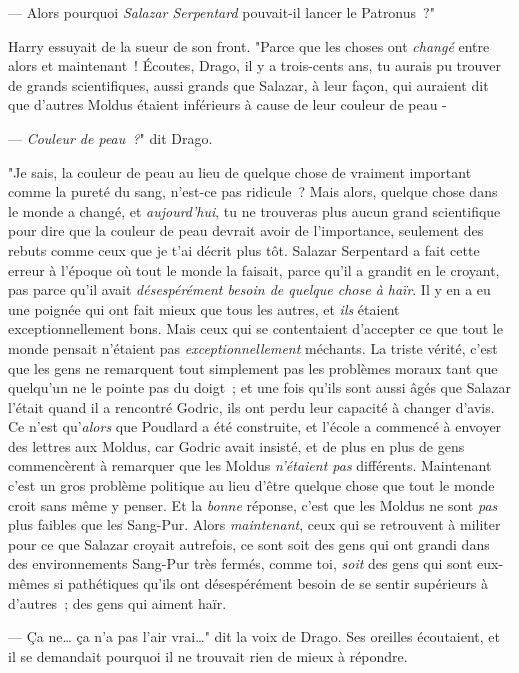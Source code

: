 --- Alors pourquoi \emph{Salazar Serpentard} pouvait-il lancer le Patronus~?"

Harry essuyait de la sueur de son front. "Parce que les choses ont \emph{changé} entre alors et maintenant~! Écoutes, Drago, il y a trois-cents ans, tu aurais pu trouver de grands scientifiques, aussi grands que Salazar, à leur façon, qui auraient dit que d'autres Moldus étaient inférieurs à cause de leur couleur de peau -

--- \emph{Couleur de peau~?}" dit Drago.

"Je sais, la couleur de peau au lieu de quelque chose de vraiment important comme la pureté du sang, n'est-ce pas ridicule~? Mais alors, quelque chose dans le monde a changé, et \emph{aujourd'hui}, tu ne trouveras plus aucun grand scientifique pour dire que la couleur de peau devrait avoir de l'importance, seulement des rebuts comme ceux que je t'ai décrit plus tôt. Salazar Serpentard a fait cette erreur à l'époque où tout le monde la faisait, parce qu'il a grandit en le croyant, pas parce qu'il avait \emph{désespérément besoin de quelque chose à haïr}. Il y en a eu une poignée qui ont fait mieux que tous les autres, et \emph{ils} étaient exceptionnellement bons. Mais ceux qui se contentaient d'accepter ce que tout le monde pensait n'étaient pas \emph{exceptionnellement} méchants. La triste vérité, c'est que les gens ne remarquent tout simplement pas les problèmes moraux tant que quelqu'un ne le pointe pas du doigt~; et une fois qu'ils sont aussi âgés que Salazar l'était quand il a rencontré Godric, ils ont perdu leur capacité à changer d'avis. Ce n'est qu'\emph{alors} que Poudlard a été construite, et l'école a commencé à envoyer des lettres aux Moldus, car Godric avait insisté, et de plus en plus de gens commencèrent à remarquer que les Moldus \emph{n'étaient pas} différents. Maintenant c'est un gros problème politique au lieu d'être quelque chose que tout le monde croit sans même y penser. Et la \emph{bonne} réponse, c'est que les Moldus ne sont \emph{pas} plus faibles que les Sang-Pur. Alors \emph{maintenant}, ceux qui se retrouvent à militer pour ce que Salazar croyait autrefois, ce sont soit des gens qui ont grandi dans des environnements Sang-Pur très fermés, comme toi, \emph{soit} des gens qui sont eux-mêmes si pathétiques qu'ils ont désespérément besoin de se sentir supérieurs à d'autres~; des gens qui aiment haïr.

--- Ça ne… ça n'a pas l'air vrai…" dit la voix de Drago. Ses oreilles écoutaient, et il se demandait pourquoi il ne trouvait rien de mieux à répondre.

